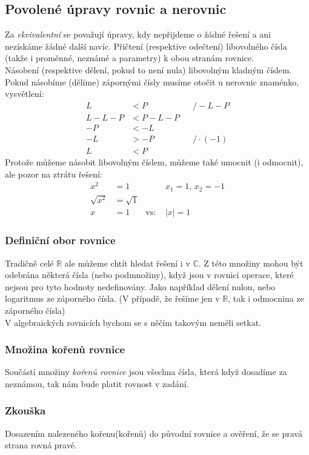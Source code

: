 \documentclass[12pt]{article}
\providecommand{\abs}[1]{\lvert#1\rvert}
\newcommand{\nR}{\mathbb{R}} %
\newcommand{\nC}{\mathbb{C}} %
\begin{document}
\subsection{Povolené úpravy rovnic a nerovnic}
Za \emph{ekvivalentní} se považují úpravy, kdy nepřijdeme o žádné řešení a ani nezískáme žádné další navíc. Přičtení (respektive odečtení) libovolného čísla (takže i proměnné, neznámé a parametry) k obou stranám rovnice.\\
Násobení (respektive dělení, pokud to není nula) libovolným kladným číslem. Pokud násobíme (dělíme) zápornými čísly musíme otočit u nerovnic znaménko, vysvětlení:
\begin{align*}
L &< P && /-L-P\\
L-L-P &< P- L -P\\
-P &< -L\\
-L &> -P && /\cdot(-1)\\
L &< P
\end{align*}
Protože můžeme násobit libovolným číslem, můžeme také umocnit (i odmocnit), ale pozor na ztrátu řešení:
\begin{align*}
x^2 &= 1 &&x_1 = 1,\, x_2 = -1\\
\sqrt{x^2} &= \sqrt{1}\\
x &= 1 & \text{vs: }& \abs{x} = 1
\end{align*}
\subsubsection{Definiční obor rovnice}
Tradičně celé $\nR$ ale můžeme chtít hledat řešení i v $\nC$. Z této množiny mohou být odebrána některá čísla (nebo podmnožiny), když jsou v rovnici operace, které nejsou pro tyto hodnoty nedefinovány. Jako například dělení nulou, nebo logaritmus ze záporného čísla. (V případě, že řešíme jen v $\nR$, tak i odmocnina ze záporného čísla)\\
V algebraických rovnicích bychom se s něčím takovým neměli setkat.
\subsubsection{Množina kořenů rovnice}
Součástí množiny \emph{kořenů rovnice} jsou všechna čísla, která když dosadíme za neznámou, tak nám bude platit rovnost v zadání.
\subsubsection{Zkouška}
Dosazením nalezeného kořenu(kořenů) do původní rovnice a ověření, že se pravá strana rovná pravé.
\end{document}
